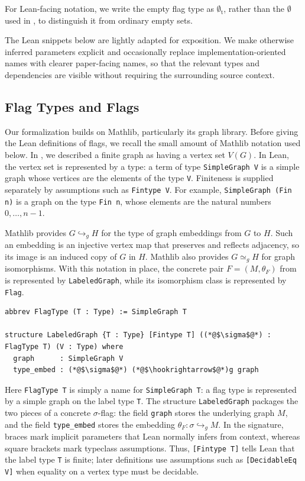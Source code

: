 \documentclass{article}
\newcommand{\lean}[1]{\texttt{#1}}
\newcommand{\emptyt}{\emptyset_{\mathrm{t}}}
\begin{document}
For Lean-facing notation, we write the empty flag type as \(\emptyt\), rather
than the \(\emptyset\) used in , to distinguish it from
ordinary empty sets.

The Lean snippets below are lightly adapted for exposition.  We make otherwise
inferred parameters explicit and occasionally replace implementation-oriented
names with clearer paper-facing names, so that the relevant types and
dependencies are visible without requiring the surrounding source context.

\subsection{Flag Types and Flags}
\label{sec:flagtypes}

Our formalization builds on Mathlib, particularly its graph library.  Before
giving the Lean definitions of flags, we recall the small amount of Mathlib
notation used below.  In , we described a finite graph as
having a vertex set $V(G)$.  In Lean, the vertex set is represented by a type:
a term of type \lean{SimpleGraph V} is a simple graph whose vertices are the
elements of the type \lean{V}.  Finiteness is supplied separately by
assumptions such as \lean{Fintype V}.  For example,
\lean{SimpleGraph (Fin n)} is a graph on the type \lean{Fin n}, whose elements
are the natural numbers \(0,\ldots,n-1\).

Mathlib provides ${G\hookrightarrow_g H}$ for the type of graph embeddings
from $G$ to $H$.  Such an embedding is an injective vertex map that
preserves and reflects adjacency, so its image is an induced copy of $G$
in $H$.  Mathlib also provides $G\simeq_g H$ for graph isomorphisms.
With this notation in place, the concrete pair $F=(M,\theta_F)$ from
 is represented by \lean{LabeledGraph}, while its
isomorphism class is represented by \lean{Flag}.

\begin{lstlisting}
abbrev FlagType (T : Type) := SimpleGraph T

structure LabeledGraph {T : Type} [Fintype T] ((*@$\sigma$@*) : FlagType T) (V : Type) where
  graph      : SimpleGraph V
  type_embed : (*@$\sigma$@*) (*@$\hookrightarrow$@*)g graph
\end{lstlisting}
Here \lean{FlagType T} is simply a name for \lean{SimpleGraph T}: a flag type
is represented by a simple graph on the label type \lean{T}.  The structure
\lean{LabeledGraph} packages the two pieces of a concrete $\sigma$-flag: the
field \lean{graph} stores the underlying graph $M$, and the field
\lean{type\_embed} stores the embedding
$\theta_F:\sigma\hookrightarrow_g M$.  In the signature, braces mark
implicit parameters that Lean normally infers from context, whereas square
brackets mark typeclass assumptions.  Thus, \lean{[Fintype T]} tells Lean that
the label type \lean{T} is finite; later definitions use assumptions such as
\lean{[DecidableEq V]} when equality on a vertex type must be decidable.
\end{document}
